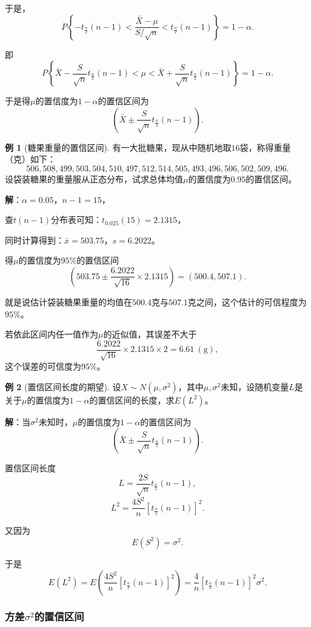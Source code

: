 \documentclass[11pt,a4paper]{report}
\theoremstyle{definition}
\newtheorem{example}{例}[chapter]
\begin{document}
于是，
\[
P\left\{-t_{\frac{\alpha}{2}}(n-1)<\frac{\bar{X}-\mu}{S/\sqrt{n}}<t_{\frac{\alpha}{2}}(n-1)\right\}=1-\alpha.
\]

即
\[
P\left\{\bar{X}-\frac{S}{\sqrt{n}}t_{\frac{\alpha}{2}}(n-1)<\mu<\bar{X}+\frac{S}{\sqrt{n}}t_{\frac{\alpha}{2}}(n-1)\right\}=1-\alpha.
\]

于是得$\mu$的置信度为$1-\alpha$的置信区间为
\[
\left(\bar{X}\pm\frac{S}{\sqrt{n}}t_{\frac{\alpha}{2}}(n-1)\right).
\]

\begin{example}[糖果重量的置信区间]
有一大批糖果，现从中随机地取$16$袋，称得重量（克）如下：
\[
506,508,499,503,504,510,497,512,514,505,493,496,506,502,509,496.
\]
设袋装糖果的重量服从正态分布，试求总体均值$\mu$的置信度为$0.95$的置信区间。

\textbf{解}：$\alpha=0.05$，$n-1=15$，

查$t(n-1)$分布表可知：$t_{0.025}(15)=2.1315$，

同时计算得到：$\bar{x}=503.75$，$s=6.2022$。

得$\mu$的置信度为$95\%$的置信区间
\[
\left(503.75\pm\frac{6.2022}{\sqrt{16}}\times2.1315\right)=(500.4,507.1).
\]

就是说估计袋装糖果重量的均值在$500.4$克与$507.1$克之间，这个估计的可信程度为$95\%$。

若依此区间内任一值作为$\mu$的近似值，其误差不大于
\[
\frac{6.2022}{\sqrt{16}}\times2.1315\times2=6.61\ (\text{g}),
\]
这个误差的可信度为$95\%$。
\end{example}

\begin{example}[置信区间长度的期望]
设$X\sim N(\mu,\sigma^{2})$，其中$\mu,\sigma^{2}$未知，设随机变量$L$是关于$\mu$的置信度为$1-\alpha$的置信区间的长度，求$E(L^{2})$。

\textbf{解}：当$\sigma^{2}$未知时，$\mu$的置信度为$1-\alpha$的置信区间为
\[
\left(\bar{X}\pm\frac{S}{\sqrt{n}}t_{\frac{\alpha}{2}}(n-1)\right).
\]

置信区间长度
\[
L=\frac{2S}{\sqrt{n}}t_{\frac{\alpha}{2}}(n-1),
\]
\[
L^{2}=\frac{4S^{2}}{n}\left[t_{\frac{\alpha}{2}}(n-1)\right]^{2}.
\]

又因为
\[
E(S^{2})=\sigma^{2}.
\]

于是
\[
E(L^{2})=E\left(\frac{4S^{2}}{n}\left[t_{\frac{\alpha}{2}}(n-1)\right]^{2}\right)=\frac{4}{n}\left[t_{\frac{\alpha}{2}}(n-1)\right]^{2}\sigma^{2}.
\]
\end{example}

\subsubsection{方差\texorpdfstring{$\sigma^{2}$}{sigma^2}的置信区间}
\end{document}

